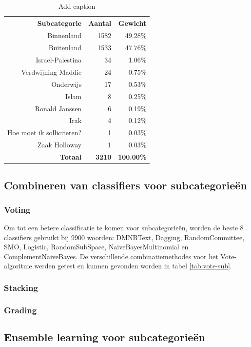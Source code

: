 \begin{table}[htbp]
	\centering
	\caption{Add caption}
	\begin{tabular}{rrr}
		\toprule
		\textbf{Subcategorie} & \textbf{Aantal} & \textbf{Gewicht} \\
		\midrule
		Binnenland & 1582  & 49.28\% \\
		Buitenland & 1533  & 47.76\% \\
		Israel-Palestina & 34    & 1.06\% \\
		Verdwijning Maddie & 24    & 0.75\% \\
		Onderwijs & 17    & 0.53\% \\
		Islam & 8     & 0.25\% \\
		Ronald Janssen & 6     & 0.19\% \\
		Irak  & 4     & 0.12\% \\
		Hoe moet ik solliciteren? & 1     & 0.03\% \\
		Zaak Holloway & 1     & 0.03\% \\
		\textbf{Totaal} & \textbf{3210} & \textbf{100.00\%} \\
		\bottomrule
	\end{tabular}
	\label{tab:hln-2008-01-nieuws}%
\end{table}%

\subsection{Combineren van classifiers voor subcategorie\"en}
\subsubsection{Voting}
Om tot een betere classificatie te komen voor subcategorie\"en, worden de beste 8 classifiers gebruikt bij 9900 woorden: DMNBText, Dagging,  RandomCommittee, SMO, Logistic, RandomSubSpace, NaiveBayesMultinomial en ComplementNaiveBayes. De verschillende combinatiemethodes voor het Vote-algoritme werden getest en kunnen gevonden worden in tabel \ref{tab:vote-sub}. 



\subsubsection{Stacking}
\subsubsection{Grading}
\subsection{Ensemble learning voor subcategorie\"en}
